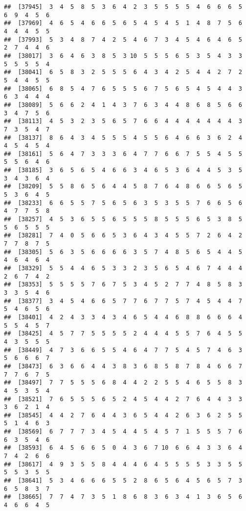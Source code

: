 \documentclass[
]{book}
\begin{document}
\begin{verbatim}
##  [37945]  3  4  5  8  5  3  6  4  2  3  5  5  5  5  4  6  6  6  5  6  9  4  5  6
##  [37969]  4  6  5  4  6  6  5  6  5  4  5  4  5  1  4  8  7  5  6  4  4  4  5  5
##  [37993]  5  3  4  8  7  4  2  5  4  6  7  3  4  5  4  6  4  6  5  2  7  4  4  6
##  [38017]  3  6  4  6  3  8  5  3 10  5  5  5  6  5  3  5  4  3  3  5  5  5  5  4
##  [38041]  6  5  8  3  2  5  5  5  6  4  3  4  2  5  4  4  2  7  2  5  4  4  5  5
##  [38065]  6  8  5  4  7  6  5  5  5  6  7  5  6  5  4  5  4  4  3  6  3  4  4  4
##  [38089]  5  6  6  2  4  1  4  3  7  6  3  4  4  8  6  8  5  6  6  3  4  7  5  6
##  [38113]  4  5  3  2  3  5  6  5  7  6  6  4  4  4  4  4  4  4  3  7  3  5  4  7
##  [38137]  8  6  4  3  4  5  5  5  4  5  5  6  4  6  6  3  6  2  4  4  5  4  5  4
##  [38161]  5  6  4  7  3  3  3  6  4  7  7  6  6  7  5  5  4  5  5  5  5  6  4  6
##  [38185]  3  6  5  6  5  4  6  6  3  4  6  5  3  6  4  4  5  3  5  3  4  3  6  4
##  [38209]  5  5  8  6  5  6  4  4  5  8  7  6  4  8  6  6  5  6  5  5  3  6  4  5
##  [38233]  6  6  5  5  7  5  6  5  6  3  5  3  5  5  7  6  6  5  6  4  7  7  5  8
##  [38257]  4  5  3  6  5  5  6  5  5  5  8  5  5  5  6  5  3  8  5  5  6  5  5  5
##  [38281]  7  4  0  5  6  6  5  3  6  4  3  4  5  5  7  2  6  4  2  7  7  8  7  5
##  [38305]  5  6  3  5  6  6  6  6  3  5  7  4  8  5  6  5  4  4  5  4  6  4  6  4
##  [38329]  5  5  4  4  6  5  3  3  2  3  5  6  5  4  6  7  4  4  4  2  6  7  4  2
##  [38353]  5  5  5  5  7  6  7  5  3  4  5  2  7  7  4  8  5  8  3  3  3  5  4  6
##  [38377]  3  4  5  4  6  6  5  7  7  6  7  7  5  7  4  5  4  4  7  5  4  6  5  6
##  [38401]  4  2  4  3  3  4  3  4  6  5  4  4  6  8  8  6  6  6  4  5  5  4  5  7
##  [38425]  4  5  7  7  5  5  5  5  2  4  4  4  5  5  7  6  4  5  5  4  3  5  5  5
##  [38449]  4  7  3  6  6  5  5  4  6  4  7  7  5  4  5  7  4  6  3  5  6  6  6  7
##  [38473]  6  3  6  6  4  4  3  8  3  6  8  5  8  7  8  4  6  6  7  7  7  6  7  5
##  [38497]  7  7  5  5  5  6  8  4  4  2  2  5  5  4  6  5  5  8  3  4  5  3  5  4
##  [38521]  7  6  5  5  5  6  5  2  4  5  4  4  2  7  6  4  4  3  3  3  6  2  1  4
##  [38545]  4  4  2  7  6  4  4  3  6  5  4  4  2  6  3  6  2  5  5  5  1  4  6  3
##  [38569]  6  7  7  7  3  4  5  4  4  5  4  5  7  1  5  5  5  7  6  6  3  5  4  6
##  [38593]  6  4  5  6  6  5  0  4  3  6  7 10  6  6  4  3  3  6  4  7  4  2  6  6
##  [38617]  4  9  3  5  5  8  4  4  4  6  4  5  5  5  5  3  3  5  5  5  5  3  5  5
##  [38641]  5  3  4  6  6  6  5  5  2  8  6  5  6  4  5  6  5  7  3  6  5  8  3  7
##  [38665]  7  7  4  7  3  5  1  8  6  8  3  6  3  4  1  3  6  5  6  4  6  6  4  5

\end{verbatim}
\end{document}
